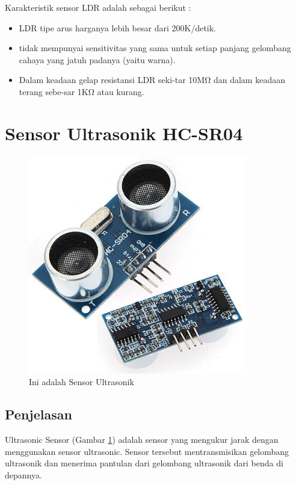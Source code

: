 Karakteristik sensor LDR adalah sebagai berikut :

\begin{itemize}
	\item LDR tipe arus harganya lebih besar dari 200K/detik.
	\item tidak mempunyai sensitivitas yang sama untuk setiap panjang gelombang cahaya yang jatuh padanya (yaitu warna).
	\item Dalam keadaan gelap resistansi LDR seki-tar 10MΩ dan dalam keadaan terang sebe-sar 1KΩ atau kurang.
\end{itemize}

\section{Sensor Ultrasonik HC-SR04}
\begin{figure}[!htbp]
  \centering
  \includegraphics[width=.75\textwidth]{figures/Arduino/sensor.jpg}
  \caption{Ini adalah Sensor Ultrasonik}\label{fig:ultra}
\end{figure}

\subsection{Penjelasan}
Ultrasonic Sensor (Gambar \ref{fig:ultra}) adalah sensor yang mengukur jarak dengan menggunakan sensor ultrasonic. Sensor tersebut mentransmisikan gelombang ultrasonik dan menerima pantulan dari gelombang ultrasonik dari benda di depannya. 

